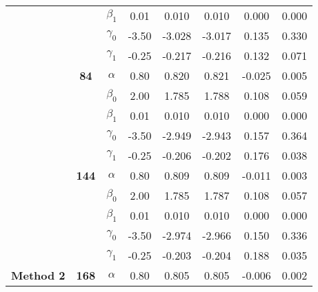 \begin{table}[h]
\begin{tabular}[t]{>{}c>{}ccccccc}
 &  & $\beta_1$ & 0.01 & 0.010 & 0.010 & 0.000 & 0.000\\

 &  & $\gamma_0$ & -3.50 & -3.028 & -3.017 & 0.135 & 0.330\\

 &  & $\gamma_1$ & -0.25 & -0.217 & -0.216 & 0.132 & 0.071\\

 & \multirow{-5}{*}{\centering\arraybackslash \textbf{84}} & $\alpha$ & 0.80 & 0.820 & 0.821 & -0.025 & 0.005\\

 &  & $\beta_0$ & 2.00 & 1.785 & 1.788 & 0.108 & 0.059\\

 &  & $\beta_1$ & 0.01 & 0.010 & 0.010 & 0.000 & 0.000\\

 &  & $\gamma_0$ & -3.50 & -2.949 & -2.943 & 0.157 & 0.364\\

 &  & $\gamma_1$ & -0.25 & -0.206 & -0.202 & 0.176 & 0.038\\

 & \multirow{-5}{*}{\centering\arraybackslash \textbf{144}} & $\alpha$ & 0.80 & 0.809 & 0.809 & -0.011 & 0.003\\

 &  & $\beta_0$ & 2.00 & 1.785 & 1.787 & 0.108 & 0.057\\

 &  & $\beta_1$ & 0.01 & 0.010 & 0.010 & 0.000 & 0.000\\

 &  & $\gamma_0$ & -3.50 & -2.974 & -2.966 & 0.150 & 0.336\\

 &  & $\gamma_1$ & -0.25 & -0.203 & -0.204 & 0.188 & 0.035\\

\multirow{-15}{*}{\centering\arraybackslash \textbf{Method 2}} & \multirow{-5}{*}{\centering\arraybackslash \textbf{168}} & $\alpha$ & 0.80 & 0.805 & 0.805 & -0.006 & 0.002\\
\bottomrule
\end{tabular}
\end{table}

